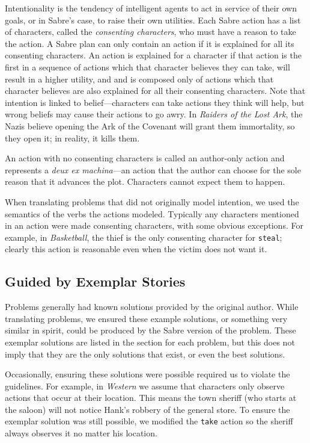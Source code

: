 \documentclass{nilreport}
\begin{document}
Intentionality is the tendency of intelligent agents to act in service
of their own goals, or in Sabre's case, to raise their own utilities.
Each Sabre action has a list of characters, called the \emph{consenting
characters}, who must have a reason to take the action. A Sabre plan
can only contain an action if it is explained for all its consenting
characters. An action is explained for a character if that action
is the first in a sequence of actions which that character believes
they can take, will result in a higher utility, and and is composed
only of actions which that character believes are also explained for
all their consenting characters. Note that intention is linked to
belief---characters can take actions they think will help, but wrong
beliefs may cause their actions to go awry. In \emph{Raiders of the
Lost Ark}, the Nazis believe opening the Ark of the Covenant will
grant them immortality, so they open it; in reality, it kills them.

An action with no consenting characters is called an author-only action
and represents a \emph{deux ex machina}---an action that the author
can choose for the sole reason that it advances the plot. Characters
cannot expect them to happen.

When translating problems that did not originally model intention,
we used the semantics of the verbs the actions modeled. Typically
any characters mentioned in an action were made consenting characters,
with some obvious exceptions. For example, in \emph{Basketball}, the
thief is the only consenting character for \texttt{steal}; clearly
this action is reasonable even when the victim does not want it.

\subsection{Guided by Exemplar Stories}

Problems generally had known solutions provided by the original author.
While translating problems, we ensured these example solutions, or
something very similar in spirit, could be produced by the Sabre version
of the problem. These exemplar solutions are listed in the section
for each problem, but this does not imply that they are the only solutions
that exist, or even the best solutions.

Occasionally, ensuring these solutions were possible required us to
violate the guidelines. For example, in \emph{Western} we assume that
characters only observe actions that occur at their location. This
means the town sheriff (who starts at the saloon) will not notice
Hank's robbery of the general store. To ensure the exemplar solution
was still possible, we modified the \texttt{take} action so the sheriff
always observes it no matter his location.
\end{document}
